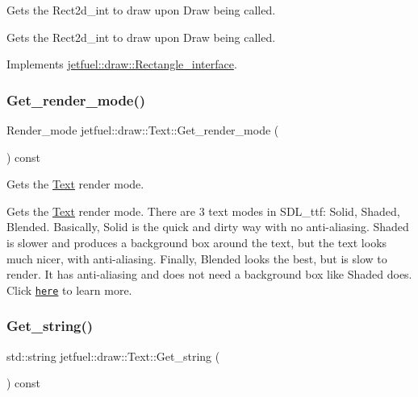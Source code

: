 Gets the Rect2d\+\_\+int to draw upon Draw being called. 

Gets the Rect2d\+\_\+int to draw upon Draw being called. 

Implements \hyperlink{classjetfuel_1_1draw_1_1Rectangle__interface_a03fd3b6842ab7b3065379caec407296f}{jetfuel\+::draw\+::\+Rectangle\+\_\+interface}.

\mbox{\label{classjetfuel_1_1draw_1_1Text_a35a5ad06ffaf6b6b2f18b0c1b02039ef}} 
\subsubsection{\texorpdfstring{Get\+\_\+render\+\_\+mode()}{Get\_render\_mode()}}
{\footnotesize\ttfamily Render\+\_\+mode jetfuel\+::draw\+::\+Text\+::\+Get\+\_\+render\+\_\+mode (\begin{DoxyParamCaption}{ }\end{DoxyParamCaption}) const\hspace{0.3cm}{\ttfamily [inline]}}



Gets the \hyperlink{classjetfuel_1_1draw_1_1Text}{Text} render mode. 

Gets the \hyperlink{classjetfuel_1_1draw_1_1Text}{Text} render mode. There are 3 text modes in S\+D\+L\+\_\+ttf\+: Solid, Shaded, Blended. Basically, Solid is the quick and dirty way with no anti-\/aliasing. Shaded is slower and produces a background box around the text, but the text looks much nicer, with anti-\/aliasing. Finally, Blended looks the best, but is slow to render. It has anti-\/aliasing and does not need a background box like Shaded does. Click \href{http://bit.ly/2tvlJUk}{\tt here} to learn more. \mbox{\label{classjetfuel_1_1draw_1_1Text_aff24355889167e97455750066ff8ded0}} 
\subsubsection{\texorpdfstring{Get\+\_\+string()}{Get\_string()}}
{\footnotesize\ttfamily std\+::string jetfuel\+::draw\+::\+Text\+::\+Get\+\_\+string (\begin{DoxyParamCaption}{ }\end{DoxyParamCaption}) const\hspace{0.3cm}{\ttfamily [inline]}}



